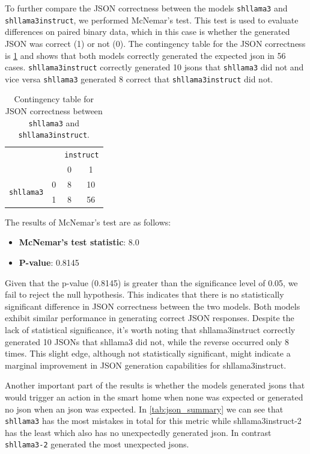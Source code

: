 To further compare the JSON correctness between the models \texttt{shllama3} and \texttt{shllama3instruct}, we performed McNemar's test. This test is used to evaluate differences on paired binary data, which in this case is whether the generated JSON was correct (1) or not (0).
The contingency table for the JSON correctness is \cref{tab:conti} and shows that both models correctly generated the expected \gls{json} in 56 cases. \texttt{shllama3instruct} correctly generated 10 \glspl{json} that \texttt{shllama3} did not and vice versa \texttt{shllama3} generated 8 correct that \texttt{shllama3instruct} did not.
\begin{table}[h]
    \centering
    \begin{tabular}{cc|c|c}
        & & \multicolumn{2}{c}{\texttt{instruct}} \\
        & & 0 & 1 \\ \hline
        \multirow{2}{*}{\texttt{shllama3}} & 0 & 8 & 10 \\ 
        & 1 & 8 & 56 \\ 
    \end{tabular}
    \caption{Contingency table for JSON correctness between \texttt{shllama3} and \texttt{shllama3instruct}.}
    \label{tab:conti}
\end{table}

The results of McNemar's test are as follows:
\begin{itemize}
    \item \textbf{McNemar's test statistic}: 8.0
    \item \textbf{P-value}: 0.8145
\end{itemize}
Given that the p-value (0.8145) is greater than the significance level of 0.05, we fail to reject the null hypothesis. This indicates that there is no statistically significant difference in JSON correctness between the two models. Both models exhibit similar performance in generating correct JSON responses.
Despite the lack of statistical significance, it's worth noting that shllama3instruct correctly generated 10 JSONs that shllama3 did not, while the reverse occurred only 8 times. This slight edge, although not statistically significant, might indicate a marginal improvement in JSON generation capabilities for shllama3instruct.

Another important part of the results is whether the models generated \glspl{json} that would trigger an action in the smart home when none was expected or generated no \gls{json} when an \gls{json} was expected.
In \cref{tab:json_summary} we can see that \texttt{shllama3} has the most mistakes in total for this metric while shllama3instruct-2 has the least which also has no unexpectedly generated \gls{json}.
In contrast \texttt{shllama3-2} generated the most unexpected \glspl{json}.

